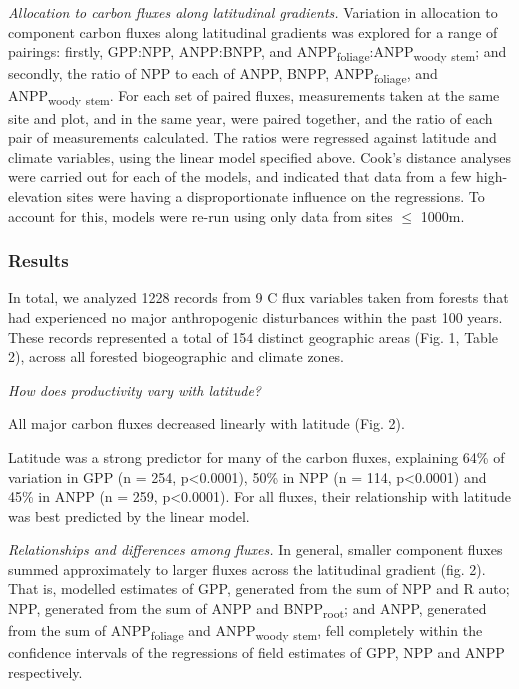 \documentclass[]{article}
\begin{document}
\emph{Allocation to carbon fluxes along latitudinal gradients.}
Variation in allocation to component carbon fluxes along latitudinal
gradients was explored for a range of pairings: firstly, GPP:NPP,
ANPP:BNPP, and ANPP\textsubscript{foliage}:ANPP\textsubscript{woody}
\textsubscript{stem}; and secondly, the ratio of NPP to each of ANPP,
BNPP, ANPP\textsubscript{foliage}, and ANPP\textsubscript{woody}
\textsubscript{stem}. For each set of paired fluxes, measurements taken
at the same site and plot, and in the same year, were paired together,
and the ratio of each pair of measurements calculated. The ratios were
regressed against latitude and climate variables, using the linear model
specified above. Cook's distance analyses were carried out for each of
the models, and indicated that data from a few high-elevation sites were
having a disproportionate influence on the regressions. To account for
this, models were re-run using only data from sites \(\le\) 1000m.

\subsubsection{Results}\label{results}

In total, we analyzed 1228 records from 9 C flux variables taken from
forests that had experienced no major anthropogenic disturbances within
the past 100 years. These records represented a total of 154 distinct
geographic areas (Fig. 1, Table 2), across all forested biogeographic
and climate zones.

\emph{How does productivity vary with latitude?}

All major carbon fluxes decreased linearly with latitude (Fig. 2).

Latitude was a strong predictor for many of the carbon fluxes,
explaining 64\% of variation in GPP (n = 254, p\textless{}0.0001), 50\%
in NPP (n = 114, p\textless{}0.0001) and 45\% in ANPP (n = 259,
p\textless{}0.0001). For all fluxes, their relationship with latitude
was best predicted by the linear model.

\emph{Relationships and differences among fluxes.} In general, smaller
component fluxes summed approximately to larger fluxes across the
latitudinal gradient (fig. 2). That is, modelled estimates of GPP,
generated from the sum of NPP and R auto; NPP, generated from the sum of
ANPP and BNPP\textsubscript{root}; and ANPP, generated from the sum of
ANPP\textsubscript{foliage} and ANPP\textsubscript{woody}
\textsubscript{stem}, fell completely within the confidence intervals of
the regressions of field estimates of GPP, NPP and ANPP respectively.
\end{document}
